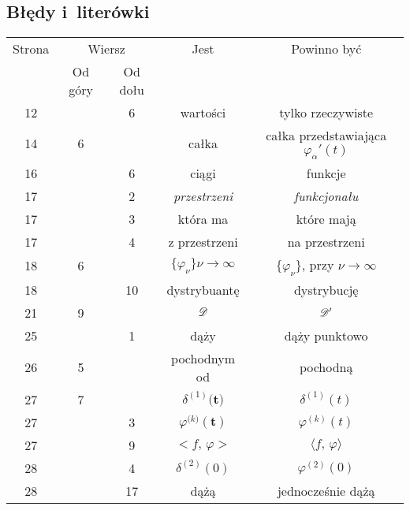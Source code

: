 \documentclass[a4paper,11pt]{article}
\numberwithin{equation}{section}
\begin{document}
\subsection{Błędy i~literówki}

\label{sec:Bledy-i-literowski}

\VerSpaceThree


\begin{center}

  \begin{tabular}{|c|c|c|c|c|}
    \hline
    Strona & \multicolumn{2}{c|}{Wiersz} & Jest
                              & Powinno być \\ \cline{2-3}
    & Od góry & Od dołu & & \\
    \hline
    12  & & \hphantom{0}6 & wartości & tylko rzeczywiste \\
    14  & \hphantom{0}6 & & całka
    & całka przedstawiająca $\varphi_{ \alpha }'( t )$ \\
    16  & & \hphantom{0}6 & ciągi & funkcje \\
    17  & & \hphantom{0}2 & \textit{przestrzeni} & \textit{funkcjonału} \\
    17  & & \hphantom{0}3 & która ma & które mają \\
    17  & & \hphantom{0}4 & z przestrzeni & na przestrzeni \\
    18  & \hphantom{0}6 & & $\{ \varphi_{ \nu } \}\nu \to \infty$
    & $\{ \varphi_{ \nu } \}$, przy $\nu \to \infty$ \\
    18  & & 10 & dystrybuantę & dystrybucję \\
    21  & \hphantom{0}9 & & $\mathcal{D}$ & $\mathcal{D}'$ \\
    25  & & \hphantom{0}1 & dąży & dąży punktowo \\
    26  & \hphantom{0}5 & & pochodnym od & pochodną \\
    27  & \hphantom{0}7 & & $\delta^{ ( 1 ) }\boldsymbol{ ( t } )$
    & $\delta^{ ( 1 ) }( t )$ \\
    27  & & \hphantom{0}3 & $\varphi^{ ( k \boldsymbol{ ) } }\boldsymbol{ ( t ) } $
           & $\varphi^{ ( k ) }( t )$ \\
    27  & & \hphantom{0}9 & $< f,\, \varphi >$ & $\langle f, \, \varphi \rangle$ \\
    28  & & \hphantom{0}4 & $\delta^{ ( 2 ) }( 0 )$ & $\varphi^{ ( 2 ) }( 0 )$ \\
    28  & & 17 & dążą & jednocześnie dążą \\

\end{tabular}
\end{center}
\end{document}
